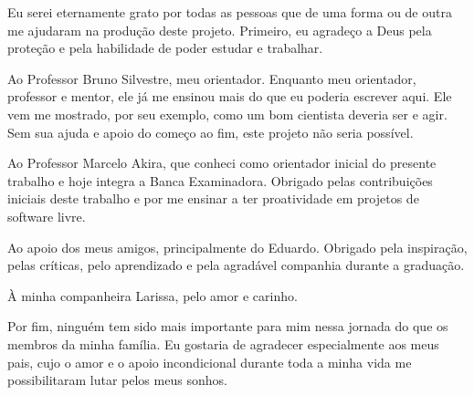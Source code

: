 \begin{agradecimentos}

Eu serei eternamente grato por todas as pessoas que de uma forma ou de outra me ajudaram na produção deste projeto. Primeiro, eu agradeço a Deus pela proteção e pela habilidade de poder estudar e trabalhar.

Ao Professor Bruno Silvestre, meu orientador. Enquanto meu orientador, professor e mentor, ele já me ensinou mais do que eu poderia escrever aqui. Ele vem me mostrado, por seu exemplo, como um bom cientista deveria ser e agir. Sem sua ajuda e apoio do começo ao fim, este projeto não seria possível.

Ao Professor Marcelo Akira, que conheci como orientador inicial do presente trabalho e hoje integra a Banca Examinadora. Obrigado pelas contribuições iniciais deste trabalho e por me ensinar a ter proatividade em projetos de software livre.

Ao apoio dos meus amigos, principalmente do Eduardo. Obrigado pela inspiração, pelas críticas, pelo aprendizado e pela agradável companhia durante a graduação.

À minha companheira Larissa, pelo amor e carinho.

Por fim, ninguém tem sido mais importante para mim nessa jornada do que os membros da minha família. Eu gostaria de agradecer especialmente aos meus pais, cujo o amor e o apoio incondicional durante toda a minha vida me possibilitaram lutar pelos meus sonhos.
\end{agradecimentos}

